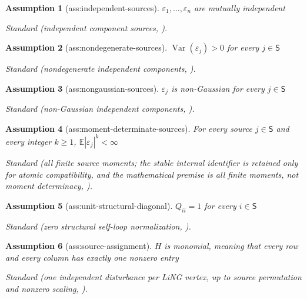 \documentclass{article}
\newtheorem{assumption}{Assumption}
\begin{document}
\begin{assumption}[ass:independent-sources]\label{ass:independent-sources}
\(\varepsilon_1,\ldots,\varepsilon_n\) are mutually independent
\par\smallskip\noindent\emph{Standard} (independent component sources, \cite{Comon1994}).
\end{assumption}

\begin{assumption}[ass:nondegenerate-sources]\label{ass:nondegenerate-sources}
\(\operatorname{Var}(\varepsilon_j)>0\) for every \(j\in\mathsf S\)
\par\smallskip\noindent\emph{Standard} (nondegenerate independent components, \cite{Comon1994}).
\end{assumption}

\begin{assumption}[ass:nongaussian-sources]\label{ass:nongaussian-sources}
\(\varepsilon_j\) is non-Gaussian for every \(j\in\mathsf S\)
\par\smallskip\noindent\emph{Standard} (non-Gaussian independent components, \cite{Comon1994}).
\end{assumption}

\begin{assumption}[ass:moment-determinate-sources]\label{ass:moment-determinate-sources}
For every source \(j\in\mathsf S\) and every integer \(k\ge1\), \(\mathbb E|\varepsilon_j|^k<\infty\)
\par\smallskip\noindent\emph{Standard} (all finite source moments; the stable internal identifier is retained only for atomic compatibility, and the mathematical premise is all finite moments, not moment determinacy, \cite{Marcinkiewicz1939}).
\end{assumption}

\begin{assumption}[ass:unit-structural-diagonal]\label{ass:unit-structural-diagonal}
\(Q_{ii}=1\) for every \(i\in\mathsf S\)
\par\smallskip\noindent\emph{Standard} (zero structural self-loop normalization, \cite{LacerdaSpirtesRamseyHoyer2008}).
\end{assumption}

\begin{assumption}[ass:source-assignment]\label{ass:source-assignment}
\(H\) is monomial, meaning that every row and every column has exactly one nonzero entry
\par\smallskip\noindent\emph{Standard} (one independent disturbance per LiNG vertex, up to source permutation and nonzero scaling, \cite{DaiAlbrechtSpirtesZhang2026}).
\end{assumption}
\end{document}
